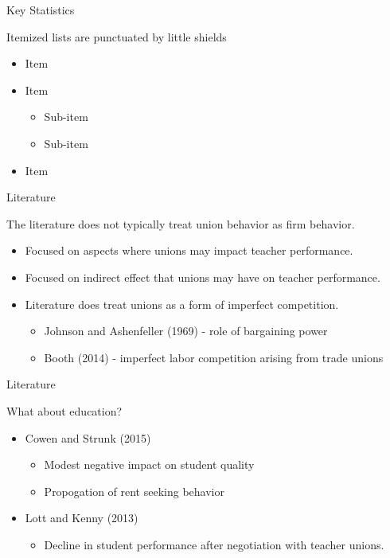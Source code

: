 \documentclass[12pt,aspectratio=169]{beamer} %
\begin{document}
\begin{frame}{Key Statistics}


Itemized lists are punctuated by little shields

\begin{itemize}
	\item Item
	\item Item
	\begin{itemize}
		\item Sub-item
		\item Sub-item
	\end{itemize}
	\item Item
\end{itemize}

\end{frame}

\begin{frame}{Literature}


The literature does not typically treat union behavior as firm behavior.

\begin{itemize}
	\item Focused on aspects where unions may impact teacher performance.
	\item Focused on indirect effect that unions may have on teacher performance.
	\item Literature does treat unions as a form of imperfect competition.
	\begin{itemize}
		\item Johnson and Ashenfeller (1969) - role of bargaining power
		\item Booth (2014) - imperfect labor competition arising from trade unions
	\end{itemize}
\end{itemize}

\end{frame}

\begin{frame}{Literature}


What about education?

\begin{itemize}
	\item Cowen and Strunk (2015)
	\begin{itemize}
		\item Modest negative impact on student quality
		\item Propogation of rent seeking behavior
	\end{itemize}
	\item Lott and Kenny (2013)
	\begin{itemize}
		\item Decline in student performance after negotiation with teacher unions.
	\end{itemize}
	
\end{itemize}

\end{frame}
\end{document}
